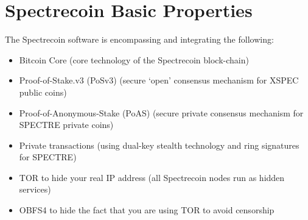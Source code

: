 \chapter{Spectrecoin Basic Properties}
The Spectrecoin software is encompassing and integrating the following: 

\begin{itemize}
	\item Bitcoin Core (core technology of the Spectrecoin block-chain) 
	\item Proof-of-Stake.v3 (PoSv3) (secure ‘open’ consensus mechanism for XSPEC public coins)
	\item Proof-of-Anonymous-Stake (PoAS) (secure private consensus mechanism for SPECTRE private coins)
	\item Private transactions (using dual-key stealth technology and ring signatures for SPECTRE) 
	\item TOR to hide your real IP address (all Spectrecoin nodes run as hidden services) 
	\item OBFS4 to hide the fact that you are using TOR to avoid censorship	
\end{itemize}
